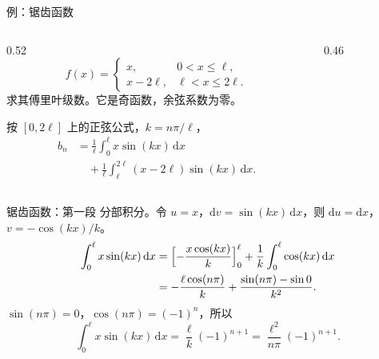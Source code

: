\documentclass[fontset=windows, chinese, 10pt, xcolor=dvipsnames]{beamer}
\begin{document}
\begin{frame}{例：锯齿函数}
  \begin{columns}[c]
    \begin{column}{0.52\textwidth}
      \begin{equation*}
        f(x)=\begin{cases}
          x, & 0<x\leq\ell,\\
          x-2\ell, & \ell<x\leq 2\ell.
        \end{cases}
      \end{equation*}
      求其傅里叶级数。它是奇函数，余弦系数为零。
      \vspace{0.35em}

      按 $[0,2\ell]$ 上的正弦公式，$k=n\pi/\ell$，
      \begin{equation*}
        \begin{aligned}
          b_n
          &=\frac{1}{\ell}\int_0^{\ell} x\sin(kx)\,\mathrm{d}x\\
          &\quad+\frac{1}{\ell}\int_{\ell}^{2\ell}(x-2\ell)\sin(kx)\,\mathrm{d}x.
        \end{aligned}
      \end{equation*}
    \end{column}
    \begin{column}{0.46\textwidth}
      \centering
    \end{column}
  \end{columns}
\end{frame}

\begin{frame}{锯齿函数：第一段}
  分部积分。令 $u=x$，$\mathrm{d}v=\sin(kx)\,\mathrm{d}x$，则 $\mathrm{d}u=\mathrm{d}x$，$v=-\cos(kx)/k$。
  \begin{align*}
    \int_0^{\ell} x\sin(kx)\,\mathrm{d}x
    &=\Bigl[-\frac{x\cos(kx)}{k}\Bigr]_0^{\ell}
      +\frac{1}{k}\int_0^{\ell}\cos(kx)\,\mathrm{d}x \\
    &=-\frac{\ell\cos(n\pi)}{k}
      +\frac{\sin(n\pi)-\sin 0}{k^2}.
  \end{align*}
  $\sin(n\pi)=0$，$\cos(n\pi)=(-1)^n$，所以
  \begin{equation*}
    \int_0^{\ell} x\sin(kx)\,\mathrm{d}x
    =\frac{\ell}{k}(-1)^{n+1}
    =\frac{\ell^2}{n\pi}(-1)^{n+1}.
  \end{equation*}
\end{frame}
\end{document}
